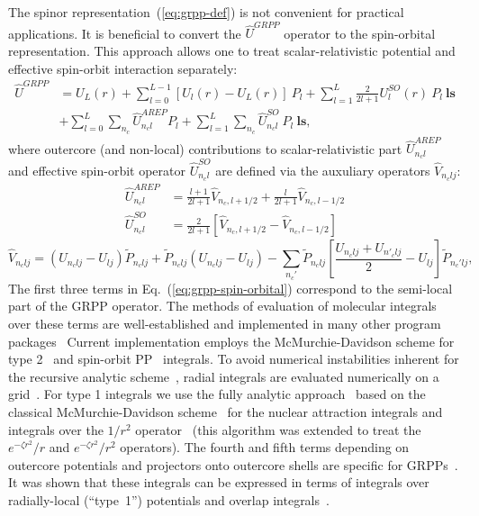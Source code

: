 \documentclass[12pt]{article}
\begin{document}
The spinor representation~(\ref{eq:grpp-def}) is not convenient for practical applications. It is beneficial to convert the $\hat{U}^{GRPP}$ operator to the spin-orbital representation. This approach allows one to treat scalar-relativistic potential
and effective spin-orbit interaction separately:
%
\begin{align}
\hat{U}^{GRPP} &= U_L(r) +
\sum^{L-1}_{l=0} \left[U_l(r) - U_L(r)\right]\ P_l +
\sum^L_{l=1} \frac{2}{2l + 1} U^{SO}_l (r)\ P_l\ \bm{ls} \nonumber \\
&+ \sum^L_{l=0} \sum_{n_c} \hat{U}^{AREP}_{n_cl} P_l + \sum^L_{l=1}\sum_{n_c}\hat{U}^{SO}_{n_cl}\ P_l\ \bm{ls},
\label{eq:grpp-spin-orbital}
\end{align}
%
where outercore (and non-local) contributions to scalar-relativistic part $\hat{U}^{AREP}_{n_cl}$ and effective spin-orbit operator $\hat{U}^{SO}_{n_cl}$ are defined via the auxuliary operators $\hat{V}_{n_clj}$:
%
\begin{align}
\hat{U}^{AREP}_{n_cl} &= \frac{l+1}{2l+1} \hat{V}_{n_c,l+1/2} + \frac{l}{2l+1} \hat{V}_{n_c,l-1/2} \label{eq:nonlocal-arep} \\
\hat{U}^{SO}_{n_cl} &= \frac{2}{2l+1} \left[ \hat{V}_{n_c,l+1/2} - \hat{V}_{n_c,l-1/2} \right]
\label{eq:nonlocal-so}
\end{align}
%
\begin{equation}
\hat{V}_{n_clj} = \left(U_{n_clj} - U_{lj}\right) \tilde{P}_{n_clj} 
+ \tilde{P}_{n_clj} \left(U_{n_clj} - U_{lj}\right)
- \sum_{n_c'} \tilde{P}_{n_clj} \left[ \frac{U_{n_clj} + U_{n'_clj}}{2} - U_{lj} \right] \tilde{P}_{n_c'lj},
\label{eq:nonlocal-operator-v}
\end{equation}
%
The first three terms in Eq.~(\ref{eq:grpp-spin-orbital}) correspond to the semi-local part of the GRPP operator. The methods of evaluation of molecular integrals over these terms are well-established and implemented in many other program packages~\cite{McMurchie:PP:81,Pitzer:91,Mitin:06,FloresMoreno:06,Dolg:11,Park:12,Shaw:17,McKenzie:18,McKenzie:PhD:20,Shaw:21} Current implementation employs the McMurchie-Davidson scheme for type 2~\cite{McMurchie:PP:81} and spin-orbit PP~\cite{Pitzer:91} integrals. To avoid numerical instabilities inherent for the recursive analytic scheme~\cite{Wullen:05}, radial integrals are evaluated numerically on a grid~\cite{Skylaris:98,FloresMoreno:06}. For type 1 integrals we use the fully analytic approach~\cite{Titov:99} based on the classical McMurchie-Davidson scheme~\cite{McMurchie:78} for the nuclear attraction integrals and integrals over the $1/r^2$ operator~\cite{Jensen:93,Gao:10} (this algorithm was extended to treat the $e^{-\zeta r^2}/r$ and $e^{-\zeta r^2}/r^2$ operators). The fourth and fifth terms depending on outercore potentials and projectors onto outercore shells are specific for GRPPs~\cite{Titov:91,Titov:99}. It was shown that these integrals can be expressed in terms of integrals over radially-local (``type~1'') potentials and overlap integrals~\cite{Oleynichenko:LIBGRPP:23}.
\end{document}
